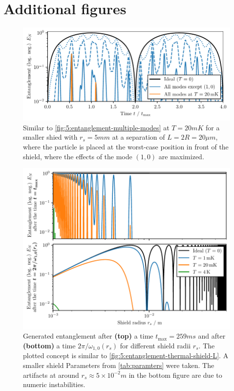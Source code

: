 \chapter{Additional figures}\label{apx:additiona-figures}
\begin{figure}[!htbp]
  \centering
  \includegraphics[width=\textwidth]{./../figures/vibrations/entanglement-dynamics-all-modes_rs-5mm.pdf}
  \caption{Similar to \cref{fig:5:entanglement-multiple-modes} at $T=20\si{mK}$ for a smaller shied with $r_s = 5\si{mm}$ at a separation of $L=2R = 20\si{\mu m}$, where the particle is placed at the worst-case position in front of the shield, where the effects of the mode $(1,0)$ are maximized.}
  \label{fig:apx:entanglement-thermal-shield-rs-5mm}
\end{figure}

\begin{figure}[!htbp]
  \centering
  \includegraphics[width=\textwidth]{./../figures/vibrations/all-modes-entanglement-rs.pdf}
  \caption{Generated entanglement after \textbf{(top)} a time $t_\mathrm{max} = 259\si{ms}$ and after \textbf{(bottom)} a time $2\pi/\omega_{1,0}(r_s)$ for different shield radii $r_s$. The plotted concept is similar to \cref{fig:5:entanglement-thermal-shield-L}. A smaller shield Parameters from \cref{tab:paramters} were taken. The artifacts at around $r_s \approx 5\times 10^{-2}\si{m}$ in the bottom figure are due to numeric instabilities.}
  \label{fig:apx:entanglement-thermal-shield-rs}
\end{figure}